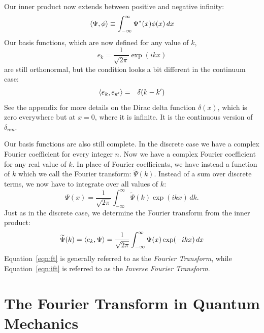 \documentclass[12pt]{article}
\begin{document}
Our inner product now extends between positive and negative infinity:
\begin{equation}
\braket{\Psi, \phi} \equiv \int_{-\infty}^{\infty} \Psi^*(x) \phi(x) \, dx
\end{equation}
Our basis functions, which are now defined for any value of $k$,
\begin{equation}
e_k = \frac{1}{\sqrt{2\pi}} \exp(i k x)
\end{equation}
are still orthonormal, but the condition looks a bit different in the continuum case:
\begin{eqnarray*}
\braket{e_k, e_{k'}} &=& \delta(k-k')
\end{eqnarray*}
See the appendix for more details on the Dirac delta function $\delta(x)$, which is zero everywhere but at $x=0$, where it is infinite.  It is the continuous version of $\delta_{nm}$.

Our basis functions are also still complete.  In the discrete case we have a complex Fourier coefficient for every integer $n$.   Now we have a complex Fourier coefficient for any real value of $k$.  In place of Fourier coefficients, we have instead a function of $k$ which we call the Fourier transform: $\widetilde{\Psi}(k)$.
Instead of a sum over discrete terms, we now have to integrate over all values of $k$:
\begin{equation} \label{eqn:ift}
\Psi(x) = \frac{1}{\sqrt{2\pi}} \int_{-\infty}^{\infty} \widetilde{\Psi}(k) \exp(ikx) \, dk.
\end{equation}
Just as in the discrete case, we determine the Fourier transform from the inner product:
\begin{equation} \label{eqn:ft}
\widetilde{\Psi}(k) = \braket{e_k, \Psi} = \frac{1}{\sqrt{2\pi}} \int_{-\infty}^{\infty} {\Psi}(x) \exp(-ikx) \, dx
\end{equation}
Equation~\ref{eqn:ft} is generally referred to as the {\em Fourier Transform}, while Equation~\ref{eqn:ift} is referred to as the {\em Inverse Fourier Transform}.

\section{The Fourier Transform in Quantum Mechanics}
\end{document}
